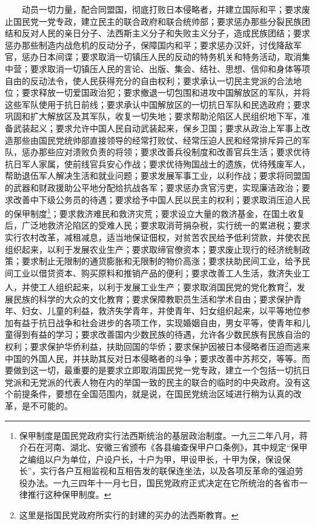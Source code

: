 \documentclass[cn,11pt,chinese]{elegantbook}
\begin{document}
　　动员一切力量，配合同盟国，彻底打败日本侵略者，并建立国际和平；要求废止国民党一党专政，建立民主的联合政府和联合统帅部；要求惩办那些分裂民族团结和反对人民的亲日分子、法西斯主义分子和失败主义分子，造成民族团结；要求惩办那些制造内战危机的反动分子，保障国内和平；要求惩办汉奸，讨伐降敌军官，惩办日本间谍；要求取消一切镇压人民的反动的特务机关和特务活动，取消集中营；要求取消一切镇压人民的言论、出版、集会、结社、思想、信仰和身体等项自由的反动法令，使人民获得充分的自由权利；要求承认一切民主党派的合法地位；要求释放一切爱国政治犯；要求撤退一切包围和进攻中国解放区的军队，并将这些军队使用于抗日前线；要求承认中国解放区的一切抗日军队和民选政府；要求巩固和扩大解放区及其军队，收复一切失地；要求帮助沦陷区人民组织地下军，准备武装起义；要求允许中国人民自动武装起来，保乡卫国；要求从政治上军事上改造那些由国民党统帅部直接领导的经常打败仗、经常压迫人民和经常排斥异己的军队，惩办那些应对溃败负责的将领；要求改善兵役制度和改善官兵生活；要求优待抗日军人家属，使前线官兵安心作战；要求优待殉国战士的遗族，优待残废军人，帮助退伍军人解决生活和就业问题；要求发展军事工业，以利作战；要求将同盟国的武器和财政援助公平地分配给抗战各军；要求惩办贪官污吏，实现廉洁政治；要求改善中下级公务员的待遇；要求给予中国人民以民主的权利；要求取消压迫人民的保甲制度\footnote[13]{ 保甲制度是国民党政府实行法西斯统治的基层政治制度。一九三二年八月，蒋介石在河南、湖北、安徽三省颁布《各县编查保甲户口条例》，其中规定“保甲之编组以户为单位，户设户长，十户为甲，甲设甲长，十甲为保，保设保长”，实行各户互相监视和互相告发的联保连坐法，以及各项反革命的强迫劳役办法。一九三四年十一月七日，国民党政府正式决定在它所统治的各省市一律推行这种保甲制度。}；要求救济难民和救济灾荒；要求设立大量的救济基金，在国土收复后，广泛地救济沦陷区的受难人民；要求取消苛捐杂税，实行统一的累进税；要求实行农村改革，减租减息，适当地保证佃权，对贫苦农民给予低利贷款，并使农民组织起来，以利于发展农业生产；要求取缔官僚资本；要求废止现行的经济统制政策；要求制止无限制的通货膨胀和无限制的物价高涨；要求扶助民间工业，给予民间工业以借贷资本、购买原料和推销产品的便利；要求改善工人生活，救济失业工人，并使工人组织起来，以利于发展工业生产；要求取消国民党的党化教育\footnote[14]{  这里是指国民党政府所实行的封建的买办的法西斯教育。}，发展民族的科学的大众的文化教育；要求保障教职员生活和学术自由；要求保护青年、妇女、儿童的利益，救济失学青年，并使青年、妇女组织起来，以平等地位参加有益于抗日战争和社会进步的各项工作，实现婚姻自由，男女平等，使青年和儿童得到有益的学习；要求改善国内少数民族的待遇，允许各少数民族有民族自治的权利；要求保护华侨利益，扶助回国的华侨；要求保护因被日本侵略者压迫而逃来中国的外国人民，并扶助其反对日本侵略者的斗争；要求改善中苏邦交，等等。而要做到这一切，最重要的是要求立即取消国民党一党专政，建立一个包括一切抗日党派和无党派的代表人物在内的举国一致的民主的联合的临时的中央政府。没有这个前提条件，要想在全国范围内，就是说，在国民党统治区域进行稍为认真的改革，是不可能的。\\
\end{document}
